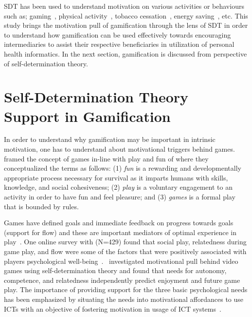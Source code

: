 SDT has been used to understand motivation on various activities or behaviours such as; gaming~\citep{ryan2006:motivationalpull}, physical activity~\citep{power2011:obesity}, tobacco cessation~\citep{williams2006:testing}, energy saving~\citep{webb2013:self}, etc. This study brings the motivation pull of gamification through the lens of SDT in order to understand how gamification can be used effectively towards encouraging intermediaries to assist their respective beneficiaries in utilization of personal health informatics. In the next section, gamification is discussed from perspective of self-determination theory.
\section{Self-Determination Theory Support in Gamification}
In order to understand why gamification may be important in intrinsic motivation, one has to understand about motivational triggers behind games.~\cite{knaving2013designing} framed the concept of games in-line with play and fun of where they conceptualized the terms as follows: (1) \emph{fun} is a rewarding and developmentally appropriate process necessary for survival as it imparts humans with skills, knowledge, and social cohesiveness; (2) \emph{play} is a voluntary engagement to an activity in order to have fun and feel pleasure; and (3) \emph{games} is a formal play that is bounded by rules. 

Games have defined goals and immediate feedback on progress towards goals (support for flow) and these are important mediators of optimal experience in play~\citep{knaving2013designing}. One online survey with (N=429) found that social play, relatedness during game play, and flow were some of the factors that were positively associated with players psychological well-being~\citep{vella2013positively}.~\cite{ryan2006:motivationalpull} investigated motivational pull behind video games using self-determination theory and found that needs for autonomy, competence, and relatedness independently predict enjoyment and future game play. The importance of providing support for the three basic psychological needs has been emphasized  by situating the needs into motivational affordances to use ICTs with an objective of fostering motivation in usage of ICT systems~\citep{zhang2008motivational}. 

